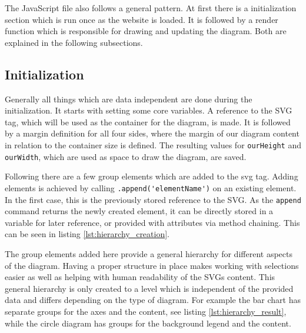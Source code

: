 The JavaScript file also follows a general pattern. At first there is a initialization section which is run once as the website is loaded. It is followed by a render function which is responsible for drawing and updating the diagram. Both are explained in the following subsections.

\subsection{Initialization}
Generally all things which are data independent are done during the initialization. It starts with setting some core variables. A reference to the SVG tag, which will be used as the container for the diagram, is made. It is followed by a margin definition for all four sides, where the margin of our diagram content in relation to the container size is defined. The resulting values for \verb|ourHeight| and \verb|ourWidth|, which are used as space to draw the diagram, are saved. 

Following there are a few group elements which are added to the svg tag. Adding elements is achieved by calling \verb|.append('elementName')| on an existing element. In the first case, this is the previously stored reference to the SVG. As the \verb|append| command returns the newly created element, it can be directly stored in a variable for later reference, or provided with attributes via method chaining.  This can be seen in listing \ref{lst:hierarchy_creation}.

The group elements added here provide a general hierarchy for different aspects of the diagram. Having a proper structure in place makes working with selections easier as well as helping with human readability of the SVGs content. This general hierarchy is only created to a level which is independent of the provided data and differs depending on the type of diagram. For example the bar chart has separate groups for the axes and the content, see listing \ref{lst:hierarchy_result}, while the circle diagram has groups for the background legend and the content.

